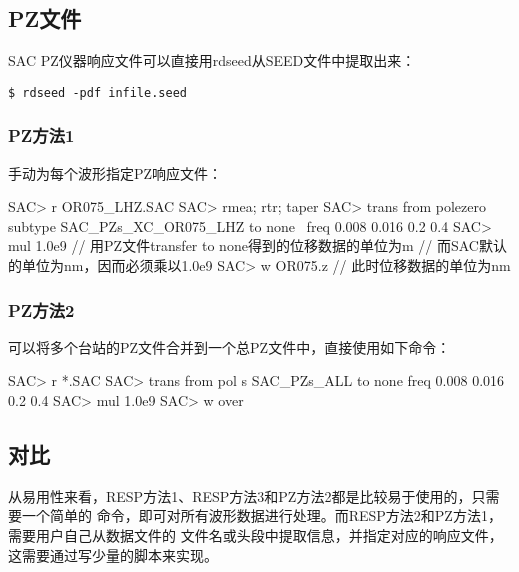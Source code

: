 \subsection{PZ文件}
SAC PZ仪器响应文件可以直接用rdseed从SEED文件中提取出来：
\begin{verbatim}
$ rdseed -pdf infile.seed
\end{verbatim}

\subsubsection{PZ方法1}
手动为每个波形指定PZ响应文件：
\begin{SACCode}
SAC> r OR075_LHZ.SAC
SAC> rmea; rtr; taper
SAC> trans from polezero subtype SAC_PZs_XC_OR075_LHZ to none \
                        freq 0.008 0.016 0.2 0.4
SAC> mul 1.0e9      // 用PZ文件transfer to none得到的位移数据的单位为m
                    // 而SAC默认的单位为nm，因而必须乘以1.0e9
SAC> w OR075.z      // 此时位移数据的单位为nm
\end{SACCode}

\subsubsection{PZ方法2}
可以将多个台站的PZ文件合并到一个总PZ文件中，直接使用如下命令：
\begin{SACCode}
SAC> r *.SAC
SAC> trans from pol s SAC_PZs_ALL to none freq 0.008 0.016 0.2 0.4
SAC> mul 1.0e9
SAC> w over
\end{SACCode}

\subsection{对比}
从易用性来看，RESP方法1、RESP方法3和PZ方法2都是比较易于使用的，只需要一个简单的
命令，即可对所有波形数据进行处理。而RESP方法2和PZ方法1，需要用户自己从数据文件的
文件名或头段中提取信息，并指定对应的响应文件，这需要通过写少量的脚本来实现。


